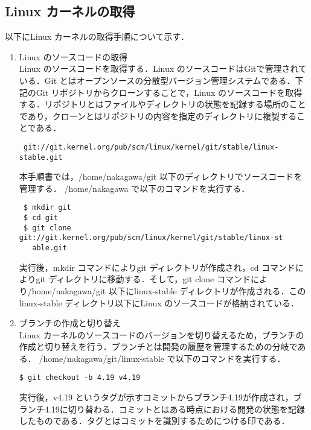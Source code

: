 \documentclass[12pt]{jsarticle}
\begin{document}
\subsection{Linux カーネルの取得}\label{sec:syutoku}
以下にLinux カーネルの取得手順について示す．
  \begin{enumerate}
  \item Linux のソースコードの取得\\    
    Linux のソースコードを取得する．Linux のソースコードはGitで管理されている．Git とはオープンソースの分散型バージョン管理システムである．下記のGit リポジトリからクローンすることで，Linux のソースコードを取得する．リポジトリとはファイルやディレクトリの状態を記録する場所のことであり，クローンとはリポジトリの内容を指定のディレクトリに複製することである．
\begin{verbatim}
 git://git.kernel.org/pub/scm/linux/kernel/git/stable/linux-stable.git
\end{verbatim}
本手順書では，/home/nakagawa/git 以下のディレクトリでソースコードを管理する．
/home/nakagawa で以下のコマンドを実行する．
\begin{verbatim}
 $ mkdir git
 $ cd git
 $ git clone git://git.kernel.org/pub/scm/linux/kernel/git/stable/linux-st
   able.git
\end{verbatim}
実行後，mkdir コマンドによりgit ディレクトリが作成され，cd コマンドによりgit ディレクトリに移動する．そして，git clone コマンドにより/home/nakagawa/git 以下にlinux-stable ディレクトリが作成される．このlinux-stable ディレクトリ以下にLinux のソースコードが格納されている．
\item ブランチの作成と切り替え\\
  Linux カーネルのソースコードのバージョンを切り替えるため，ブランチの作成と切り替えを行う．ブランチとは開発の履歴を管理するための分岐である．
  /home/nakagawa/git/linux-stable で以下のコマンドを実行する．
\begin{verbatim}
$ git checkout -b 4.19 v4.19
\end{verbatim}
  実行後，v4.19 というタグが示すコミットからブランチ4.19が作成され，ブランチ4.19に切り替わる．コミットとはある時点における開発の状態を記録したものである．タグとはコミットを識別するためにつける印である．
  \end{enumerate}
  
\end{document}
